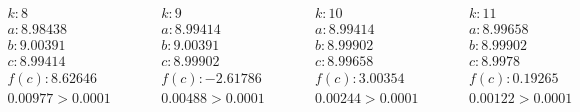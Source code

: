 \documentclass[letterpaper, 11pt]{extarticle}
\begin{document}
\begin{align*}
    \begin{aligned}
        & k: 8 \\
        & a: 8.98438 \\
        & b: 9.00391 \\
        & c: 8.99414 \\
        & f(c): 8.62646 \\
        & 0.00977 > 0.0001
    \end{aligned}
    \qquad
    \begin{aligned}
        & k: 9 \\
        & a: 8.99414 \\
        & b: 9.00391 \\
        & c: 8.99902 \\
        & f(c): -2.61786 \\
        & 0.00488 > 0.0001
    \end{aligned}
    \qquad
    \begin{aligned}
        & k: 10 \\
        & a: 8.99414 \\
        & b: 8.99902 \\
        & c: 8.99658 \\
        & f(c): 3.00354 \\
        & 0.00244 > 0.0001
    \end{aligned}
    \qquad
    \begin{aligned}
        & k: 11 \\
        & a: 8.99658 \\
        & b: 8.99902 \\
        & c: 8.9978 \\
        & f(c): 0.19265 \\
        & 0.00122 > 0.0001
    \end{aligned}
\end{align*}

\vspace{-5pt}
\end{document}
